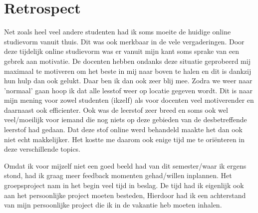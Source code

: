 \chapter{Retrospect}
\label{ch:retrospect}



Net zoals heel veel andere studenten had ik soms moeite de huidige online studievorm vanuit thuis.
Dit was ook merkbaar in de vele vergaderingen.
Door deze tijdelijk online studievorm was er vanuit mijn kant soms sprake van een gebrek aan motivatie.
De docenten hebben ondanks deze situatie geprobeerd mij maximaal te motiveren om het beste in mij naar boven te halen en dit is dankzij hun hulp dan ook gelukt.
Daar ben ik dan ook zeer blij mee.
Zodra we weer naar 'normaal' gaan hoop ik dat alle lesstof weer op locatie gegeven wordt.
Dit is naar mijn mening voor zowel studenten (ikzelf) als voor docenten veel motiverender en daarnaast ook efficienter.
Ook was de leerstof zeer breed en soms ook wel veel/moeilijk voor iemand die nog niets op deze gebieden van de desbetreffende leerstof had gedaan.
Dat deze stof online werd behandeld maakte het dan ook niet echt makkelijker.
Het kostte me daarom ook enige tijd me te oriënteren in deze verschillende topics.

Omdat ik voor mijzelf niet een goed beeld had van dit semester/waar ik ergens stond, had ik graag meer feedback momenten gehad/willen inplannen.
Het groepsproject nam in het begin veel tijd in beslag.
De tijd had ik eigenlijk ook aan het persoonlijke project moeten besteden,
Hierdoor had ik een achterstand van mijn persoonlijke project die ik in de vakantie heb moeten inhalen.



